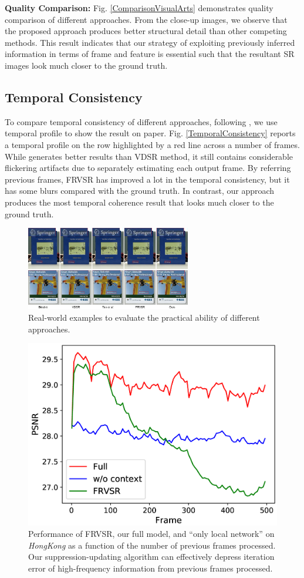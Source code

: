 \documentclass[letterpaper]{article} %
\begin{document}
\textbf{Quality Comparison:} Fig. \ref{ComparisonVisualArts} demonstrates quality comparison of different approaches. From the close-up images, we observe that the proposed approach produces better structural detail than other competing methods. This result indicates that our strategy of exploiting previously inferred information in terms of frame and feature is essential such that the resultant SR images look much closer to the ground truth.



\subsection{Temporal Consistency}

To compare temporal consistency of different approaches, following \cite{VESPCN2017cvpr}, we use temporal profile to show the result on paper. Fig. \ref{TemporalConsistency} reports a temporal profile on the row highlighted by a red line across a number of frames. While \cite{Tao2017iccv} generates better results than VDSR method, it still contains considerable flickering artifacts due to separately estimating each output frame. By referring previous frames, FRVSR has improved a lot in the temporal consistency, but it has some blurs compared with the ground truth. In contrast, our approach produces the most temporal coherence result that looks much closer to the ground truth.



\begin{figure}[t]
\centering
\includegraphics[width=7.2 cm,height=1.44in ]{Fig9.png}
\caption{Real-world examples to evaluate the practical ability of different approaches.}
\label{RealWorldExamples}
\end{figure}





\vspace{-2.90mm}
\begin{figure}[t]
\centering
\includegraphics[width=6.1 cm]{Fig11.png}
\caption{Performance of FRVSR, our full model, and ``only local network'' on \textit{HongKong} as a function of the number of previous frames processed. Our suppression-updating algorithm can effectively depress iteration error of high-frequency information from previous frames processed.}
\label{SuppressingCurve}
\end{figure}
\end{document}

